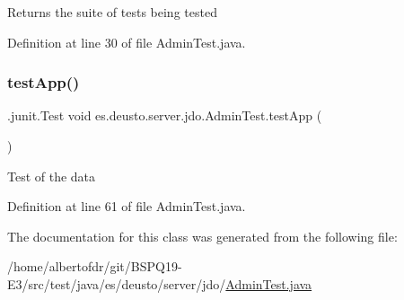 \begin{DoxyReturn}{Returns}
the suite of tests being tested 
\end{DoxyReturn}


Definition at line 30 of file Admin\+Test.\+java.

\mbox{\label{classes_1_1deusto_1_1server_1_1jdo_1_1_admin_test_aba3d4e2c7110a3bc1c7557f4491e1691}} 
\subsubsection{\texorpdfstring{test\+App()}{testApp()}}
{\footnotesize\ttfamily .junit.\+Test void es.\+deusto.\+server.\+jdo.\+Admin\+Test.\+test\+App (\begin{DoxyParamCaption}{ }\end{DoxyParamCaption})}

Test of the data 

Definition at line 61 of file Admin\+Test.\+java.



The documentation for this class was generated from the following file\+:\begin{DoxyCompactItemize}
\item 
/home/albertofdr/git/\+B\+S\+P\+Q19-\/\+E3/src/test/java/es/deusto/server/jdo/\hyperlink{_admin_test_8java}{Admin\+Test.\+java}\end{DoxyCompactItemize}
